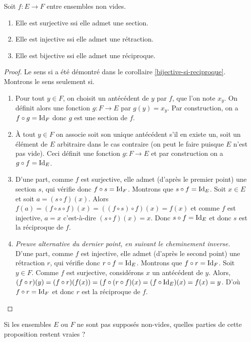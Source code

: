 \begin{proposition}
\label{bijective_ssi_reciproque}
Soit $f : E\to F$ entre ensembles non vides.
\begin{enumerate}
\item Elle est surjective ssi elle admet une section.
\item Elle est injective ssi elle admet une rétraction.
\item Elle est bijective ssi elle admet une réciproque.
\end{enumerate}
\end{proposition}
\begin{proof}
Le sens \og si\fg{} a été démontré dans le corollaire \ref{bijective-si-reciproque}. Montrons le sens \og seulement si\fg.
\begin{enumerate}
\item  Pour tout $y\in F$, on choisit un antécédent de $y$ par $f$, que l'on note $x_y$. On définit alors une fonction $g : F\to E$ par $g(y)=x_y$. Par construction, on a $f\circ g = \operatorname{Id}_F$ donc $g$ est une section de $f$.
\item À tout $y\in F$ on associe soit son unique antécédent s'il en existe un, soit un élément de $E$ arbitraire dans le cas contraire (on peut le faire puisque $E$ n'est pas vide). Ceci définit une fonction $g : F\to E$ et par construction on a $g\circ f=\operatorname{Id}_E$.
\item D'une part, comme $f$ est surjective, elle admet (d'après le premier point) une section $s$, qui vérifie donc $f\circ s = \operatorname{Id}_F$. Montrons  que $s\circ f = \operatorname{Id}_E$. Soit $x\in E$ et soit $a = (s\circ f)(x)$. Alors $f(a) = (f\circ s \circ f) (x) = ((f\circ s)\circ f)(x) = f(x)$ et comme $f$ est injective, $a=x$ c'est-à-dire $(s\circ f)(x) = x$. Donc $s\circ f=\operatorname{Id}_E$ et donc $s$ est la réciproque de $f$.
\item \emph{Preuve alternative du dernier point, en suivant le cheminement inverse.} D'une part, comme $f$ est injective, elle admet (d'après le second point) une rétraction $r$, qui vérifie donc $r\circ f=\operatorname{Id}_E$. Montrons  que $f\circ r = \operatorname{Id}_F$. Soit $y\in F$. Comme $f$ est surjective, considérons $x$ un antécédent de $y$. Alors, $(f\circ r)(y) = (f\circ r)(f(x)) =(f\circ (r \circ f)(x) = (f\circ \operatorname{Id}_E)(x) = f(x) = y$. D'où $f\circ r = \operatorname{Id}_F$ et donc $r$ est la réciproque de $f$.
\end{enumerate}
\end{proof}

\begin{exercice}[Zérologie] Si les ensembles $E$ ou $F$ ne sont pas supposés non-vides, quelles parties de cette proposition restent vraies ?
\end{exercice}



